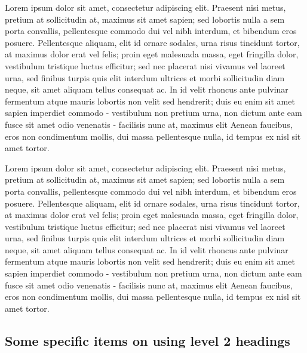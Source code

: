 \documentclass[10pt,a4paper]{book}
\begin{document}
Lorem ipsum dolor sit amet, consectetur adipiscing elit. Praesent nisi metus, pretium at sollicitudin at, maximus sit amet sapien; sed lobortis nulla a sem porta convallis, pellentesque commodo dui vel nibh interdum, et bibendum eros posuere. Pellentesque aliquam, elit id ornare sodales, urna risus tincidunt tortor, at maximus dolor erat vel felis; proin eget malesuada massa, eget fringilla dolor, vestibulum tristique luctus efficitur; sed nec placerat nisi vivamus vel laoreet urna, sed finibus turpis quis elit interdum ultrices et morbi sollicitudin diam neque, sit amet aliquam tellus consequat ac. In id velit rhoncus ante pulvinar fermentum atque mauris lobortis non velit sed hendrerit; duis eu enim sit amet sapien imperdiet commodo - vestibulum non pretium urna, non dictum ante eam fusce sit amet odio venenatis - facilisis nunc at, maximus elit Aenean faucibus, eros non condimentum mollis, dui massa pellentesque nulla, id tempus ex nisl sit amet tortor.

Lorem ipsum dolor sit amet, consectetur adipiscing elit. Praesent nisi metus, pretium at sollicitudin at, maximus sit amet sapien; sed lobortis nulla a sem porta convallis, pellentesque commodo dui vel nibh interdum, et bibendum eros posuere. Pellentesque aliquam, elit id ornare sodales, urna risus tincidunt tortor, at maximus dolor erat vel felis; proin eget malesuada massa, eget fringilla dolor, vestibulum tristique luctus efficitur; sed nec placerat nisi vivamus vel laoreet urna, sed finibus turpis quis elit interdum ultrices et morbi sollicitudin diam neque, sit amet aliquam tellus consequat ac. In id velit rhoncus ante pulvinar fermentum atque mauris lobortis non velit sed hendrerit; duis eu enim sit amet sapien imperdiet commodo - vestibulum non pretium urna, non dictum ante eam fusce sit amet odio venenatis - facilisis nunc at, maximus elit Aenean faucibus, eros non condimentum mollis, dui massa pellentesque nulla, id tempus ex nisl sit amet tortor.
\subsection{Some specific items on using level 2 headings}
\end{document}
